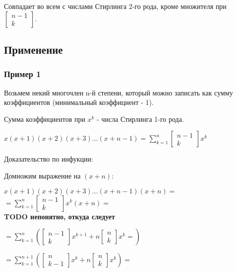 Совпадает во всем с числами Стирлинга 2-го рода, кроме множителя при $\begin{bmatrix}
n-1 \\
k
\end{bmatrix}$.

\subsection{Применение}

\subsubsection{Пример 1}

Возьмем некий многочлен n-й степени, который можно записать как сумму коэффициентов (минимальный коэффициент - 1).

Сумма коэффициентов при $ x^{k} $ - числа Стирлинга 1-го рода.

$x(x+1)(x+2)(x+3)\ldots(x+n-1) = \sum\limits_{k=1}^{n} \begin{bmatrix}
n-1 \\
k
\end{bmatrix} x^{k}$

Доказательство по инфукции:

Домножим выражение на $ (x+n) $:

$x(x+1)(x+2)(x+3)\ldots(x+n-1)(x+n) = $ \\
$= \sum\limits_{k=1}^{n} \begin{bmatrix} n-1 \\ k \end{bmatrix} x^{k} (x+n) = $\\

\textbf{TODO непонятно, откуда следует}

$= \sum\limits_{k=1}^{n} 
\left(
\begin{bmatrix} n-1 \\ k \end{bmatrix} x^{k+1} + n \begin{bmatrix} n \\ k \end{bmatrix} x^{k} = 
\right)
$

$= \sum\limits_{k=1}^{n+1} 
\left(
\begin{bmatrix} n \\ k-1 \end{bmatrix} x^{k} 
+ n \begin{bmatrix} n \\ k \end{bmatrix} x^{k}
\right) = 
$

